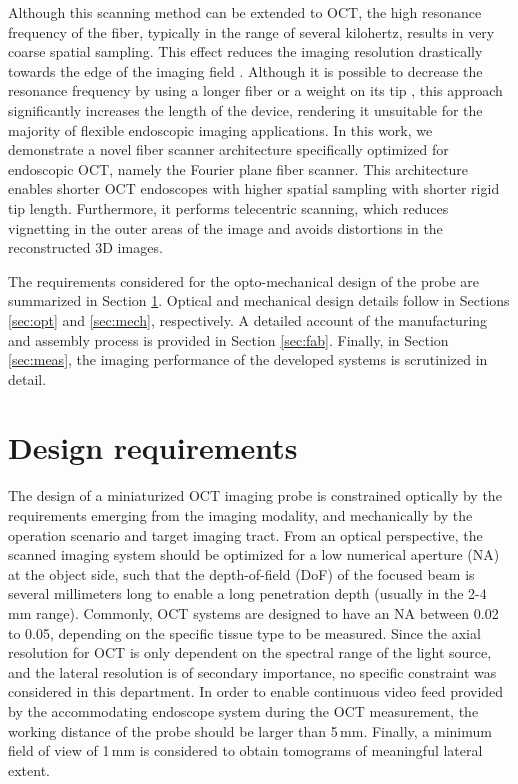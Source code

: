 \documentclass[10pt]{iopart}
\begin{document}
Although this scanning method can be extended to OCT, the high resonance frequency of the fiber, typically in the range of several kilohertz, results in very coarse spatial sampling. This effect reduces the imaging resolution drastically towards the edge of the imaging field \cite{Lurie2015}.
Although it is possible to decrease the resonance frequency by using a longer fiber or a weight on its tip \cite{Moon2010}, this approach significantly increases the length of the device, rendering it unsuitable for the majority of flexible endoscopic imaging applications. In this work, we demonstrate a novel fiber scanner architecture specifically optimized for endoscopic OCT, namely the Fourier plane fiber scanner. This architecture enables shorter OCT endoscopes with higher spatial sampling with shorter rigid tip length. Furthermore, it performs telecentric scanning, which reduces vignetting in the outer areas of the image and avoids distortions in the reconstructed 3D images. 

The requirements considered for the opto-mechanical design of the probe are summarized in Section \ref{sec:req}. Optical and mechanical design details follow in Sections \ref{sec:opt} and \ref{sec:mech}, respectively. A detailed account of the manufacturing and assembly process is provided in Section \ref{sec:fab}. Finally, in Section \ref{sec:meas}, the imaging performance of the developed systems is scrutinized in detail. 

\section{Design requirements}\label{sec:req}
The design of a miniaturized OCT imaging probe is constrained optically by the requirements emerging from the imaging modality, and mechanically by the operation scenario and target imaging tract. From an optical perspective, the scanned imaging system should be optimized for a low numerical aperture (NA) at the object side, such that the depth-of-field (DoF) of the focused beam is several millimeters long to enable a long penetration depth (usually in the 2-4 mm range). Commonly, OCT systems are designed to have an NA between 0.02 to 0.05, depending on the specific tissue type to be measured. Since the axial resolution for OCT is only dependent on the spectral range of the light source, and the lateral resolution is of secondary importance, no specific constraint was considered in this department. In order to enable continuous video feed provided by the accommodating endoscope system during the OCT measurement, the working distance of the probe should be larger than 5\,mm. Finally, a minimum field of view of 1\,mm is considered to obtain tomograms of meaningful lateral extent. 
\end{document}

